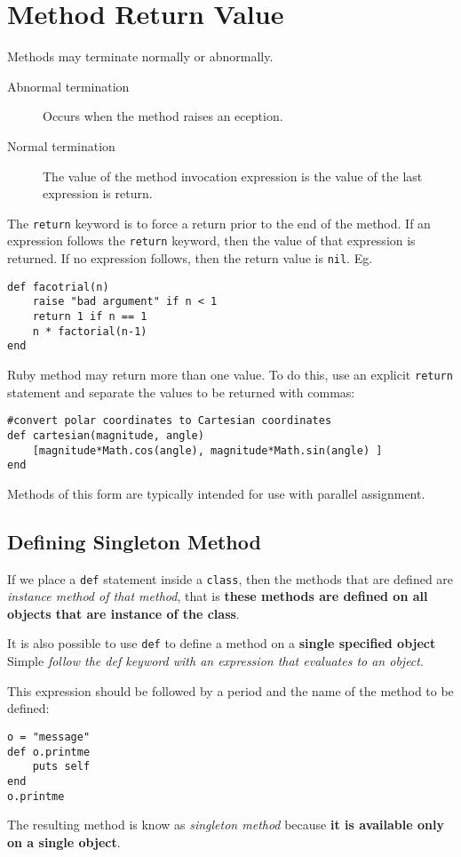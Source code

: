\documentclass[11pt, a4paper]{book}
\begin{document}
\section{Method Return Value}
Methods may terminate normally or abnormally.
\begin{description}
\item[Abnormal termination] Occurs when the method raises an eception.
\item[Normal termination] The value of the method invocation expression is the
value of the last expression is return.
\end{description}

The \verb|return| keyword is to force a return prior to the end of the method.
If an expression follows the \verb|return| keyword, then the value of that
expression is returned. If no expression follows, then the return value is
\verb|nil|. Eg.
\begin{verbatim}
def facotrial(n)
    raise "bad argument" if n < 1
    return 1 if n == 1
    n * factorial(n-1)
end
\end{verbatim}


Ruby method may return more than one value. To do this, use an explicit
\verb|return| statement and separate the values to be returned with commas:
\begin{verbatim}
#convert polar coordinates to Cartesian coordinates
def cartesian(magnitude, angle)
    [magnitude*Math.cos(angle), magnitude*Math.sin(angle) ]
end
\end{verbatim}
Methods of this form are typically intended for use with parallel assignment.

\subsection{Defining Singleton Method}
If we place a \verb|def| statement inside a \verb|class|, then the methods that
are defined are \emph{instance method of that method}, that is \textbf{these
methods are defined on all objects that are instance of the class}.

It is also possible to use \verb|def| to define a method on a \textbf{single specified
object} Simple \emph{follow the def keyword with an expression that
evaluates to an object}.

This expression should be followed by a period and the name of the method to be
defined:
\begin{verbatim}
o = "message"
def o.printme
    puts self
end
o.printme
\end{verbatim}
The resulting method is know as \emph{singleton method} because \textbf{it is
available only on a single object}.
\end{document}
